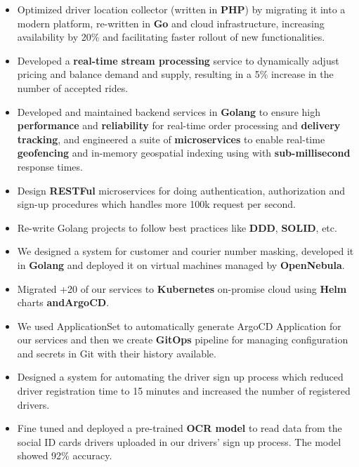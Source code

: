\begin{itemize}
      \item Optimized driver location collector (written in \textbf{PHP}) by migrating it into a modern platform, re-written in \textbf{Go} and cloud infrastructure,
            increasing availability by 20\% and facilitating faster rollout of new functionalities.
      \item Developed a \textbf{real-time stream processing} service to dynamically adjust pricing and balance demand and supply,
            resulting in a 5\% increase in the number of accepted rides.
      \item Developed and maintained backend services in \textbf{Golang} to ensure
            high \textbf{performance} and \textbf{reliability} for real-time order processing and \textbf{delivery tracking},
            and engineered a suite of \textbf{microservices} to enable real-time \textbf{geofencing} and in-memory geospatial
            indexing using  with \textbf{sub-millisecond} response times.
      \item Design \textbf{RESTFul} microservices for doing authentication, authorization and sign-up procedures which handles more 100k request per second.
      \item Re-write Golang projects to follow best practices like \textbf{DDD}, \textbf{SOLID}, etc.
      \item We designed a system for customer and courier number masking, developed it in \textbf{Golang}
            and deployed it on virtual machines managed by \textbf{OpenNebula}.
      \item Migrated +20 of our services to \textbf{Kubernetes} on-promise cloud using \textbf{Helm} charts \textbf{andArgoCD}.
      \item We used  ApplicationSet to automatically generate ArgoCD Application
            for our services and then we create \textbf{GitOps} pipeline for managing configuration
            and secrets in Git with their history available.
      \item Designed a system for automating the driver sign up process which reduced driver registration time to 15 minutes and increased the number of registered drivers.
      \item Fine tuned and deployed a pre-trained \textbf{OCR model} to read data from the social ID cards drivers uploaded in our drivers' sign up process. The model showed 92\% accuracy.

\end{itemize}
